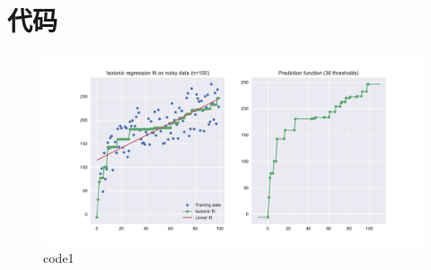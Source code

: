 \section{代码}

\begin{PythonCode}\label{例1}
	
\end{PythonCode}

\begin{figure}
	\centering
	\includegraphics[width=14cm]{codeimage/code1}
	\caption{code1}
	\label{code1}
\end{figure}
